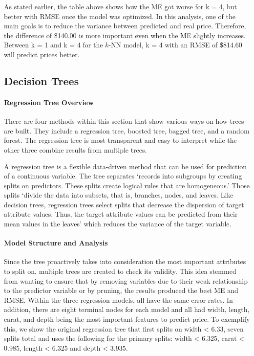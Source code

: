 \documentclass[
  paper=a4,
  ,captions=tableheading
]{scrartcl}
\begin{document}
As stated earlier, the table above shows how the ME got worse for k = 4,
but better with RMSE once the model was optimized. In this analysis, one
of the main goals is to reduce the variance between predicted and real
price. Therefore, the difference of \$140.00 is more important even when
the ME slightly increases. Between k = 1 and k = 4 for the \(k\)-NN
model, k = 4 with an RMSE of \$814.60 will predict prices better.

\hypertarget{decision-trees}{%
\subsection{Decision Trees}\label{decision-trees}}

\hypertarget{regression-tree-overview}{%
\paragraph{Regression Tree Overview}\label{regression-tree-overview}}

There are four methods within this section that show various ways on how
trees are built. They include a regression tree, boosted tree, bagged
tree, and a random forest. The regression tree is most transparent and
easy to interpret while the other three combine results from multiple
trees.

A regression tree is a flexible data-driven method that can be used for
prediction of a continuous variable. The tree separates `records into
subgroups by creating splits on predictors. These splits create logical
rules that are homogeneous.' Those splits `divide the data into subsets,
that is, branches, nodes, and leaves. Like decision trees, regression
trees select splits that decrease the dispersion of target attribute
values. Thus, the target attribute values can be predicted from their
mean values in the leaves' which reduces the variance of the target
variable.

\hypertarget{model-structure-and-analysis}{%
\paragraph{Model Structure and
Analysis}\label{model-structure-and-analysis}}

Since the tree proactively takes into consideration the most important
attributes to split on, multiple trees are created to check its
validity. This idea stemmed from wanting to ensure that by removing
variables due to their weak relationship to the predictor variable or by
pruning, the results produced the best ME and RMSE. Within the three
regression models, all have the same error rates. In addition, there are
eight terminal nodes for each model and all had width, length, carat,
and depth being the most important features to predict price. To
exemplify this, we show the original regression tree that first splits
on width \textless{} 6.33, seven splits total and uses the following for
the primary splits: width \textless{} 6.325, carat \textless{} 0.985,
length \textless{} 6.325 and depth \textless{} 3.935.
\end{document}
